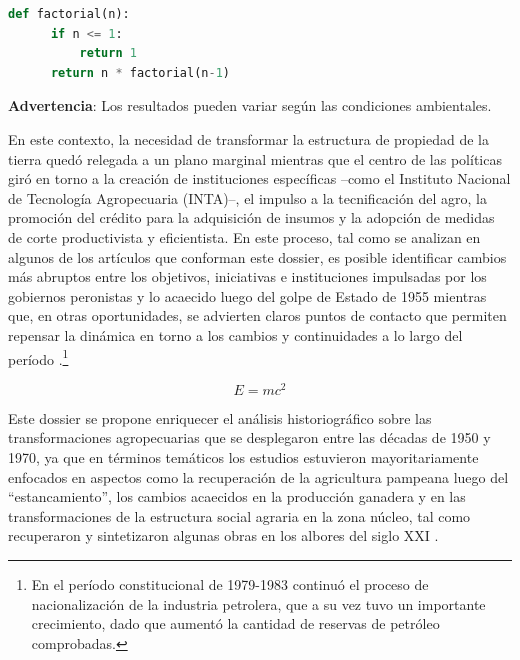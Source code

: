 \begin{lstlisting}[language=Python]
def factorial(n):
      if n <= 1:
          return 1
      return n * factorial(n-1)
\end{lstlisting}


\begin{tcolorbox}[colback=brown!8!white,colframe=brown!8!white,boxrule=0pt,arc=2pt,left=4pt,right=4pt,top=3pt,bottom=3pt,before skip=4pt,after skip=4pt]
{\sffamily\small
\textbf{Advertencia}: Los resultados pueden variar según las
  condiciones ambientales.

}
\end{tcolorbox}

En este contexto, la necesidad de transformar la estructura de propiedad de la tierra quedó relegada a un plano marginal mientras que el centro de las políticas giró en torno a la creación de instituciones específicas –como el Instituto Nacional de Tecnología Agropecuaria (INTA)–, el impulso a la tecnificación del agro, la promoción del crédito para la adquisición de insumos y la adopción de medidas de corte productivista y eficientista. En este proceso, tal como se analizan en algunos de los artículos que conforman este dossier, es posible identificar cambios más abruptos entre los objetivos, iniciativas e instituciones impulsadas por los gobiernos peronistas y lo acaecido luego del golpe de Estado de 1955 mientras que, en otras oportunidades, se advierten claros puntos de contacto que permiten repensar la dinámica en torno a los cambios y continuidades a lo largo del período \autocite{2822-AMIGOTLEACHE2009}.\footnote{En el período constitucional de 1979-1983 continuó el proceso de
  nacionalización de la industria petrolera, que a su vez tuvo un
  importante crecimiento, dado que aumentó la cantidad de reservas de
  petróleo comprobadas.}


\begin{equation}\label{eq-id}
E = mc^2
\end{equation}

Este dossier se propone enriquecer el análisis historiográfico sobre las transformaciones agropecuarias que se desplegaron entre las décadas de 1950 y 1970, ya que en términos temáticos los estudios estuvieron mayoritariamente enfocados en aspectos como la recuperación de la agricultura pampeana luego del “estancamiento”, los cambios acaecidos en la producción ganadera y en las transformaciones de la estructura social agraria en la zona núcleo, tal como recuperaron y sintetizaron algunas obras en los albores del siglo XXI \autocite{2827-BARBA1998,2832-ZEBALLOSDEHEREDIA1930}.


